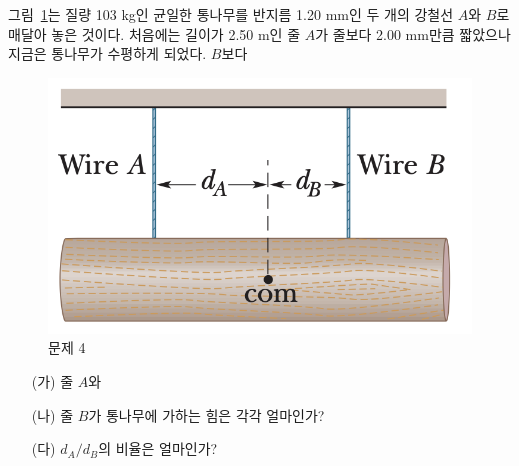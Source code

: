 \documentclass[floatfix,nofootinbib,superscriptaddress,fleqn]{revtex4-2}
\begin{document}
그림~\ref{fig:4}는 질량 103 kg인 균일한 통나무를 반지름 1.20 mm인 두
개의 강철선 $A$와 $B$로 매달아 놓은 것이다. 처음에는 길이가 2.50 m인
줄 $A$가 줄보다 2.00 mm만큼 짧았으나 지금은 통나무가 수평하게 되었다. 
$B$보다 
\begin{figure}[ht]
  \centering
\includegraphics[scale=0.25]{Qfig15-4-20220502.png}
  \caption{문제 4}
  \label{fig:4}
\end{figure}
\begin{itemize}
\item[(가)] 줄 $A$와
\item[(나)] 줄 $B$가 통나무에 가하는 힘은 각각 얼마인가? 
\item[(다)] $d_A/d_B$의 비율은 얼마인가? 
\end{itemize}

\end{document}
